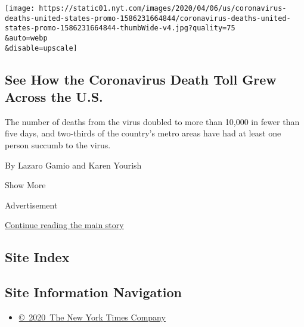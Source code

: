 \begin{enumerate}
  \texttt{[image: https://static01.nyt.com/images/2020/04/06/us/coronavirus-deaths-united-states-promo-1586231664844/coronavirus-deaths-united-states-promo-1586231664844-thumbWide-v4.jpg?quality=75\\\&auto=webp\\\&disable=upscale]}

  \hypertarget{see-how-the-coronavirus-death-toll-grew-across-the-us}{%
  \subsection{See How the Coronavirus Death Toll Grew Across the
  U.S.}\label{see-how-the-coronavirus-death-toll-grew-across-the-us}}

  The number of deaths from the virus doubled to more than 10,000 in
  fewer than five days, and two-thirds of the country's metro areas have
  had at least one person succumb to the virus.

  By Lazaro Gamio and Karen Yourish
\end{enumerate}

Show More

Advertisement

\protect\hyperlink{after-mid2}{Continue reading the main story}

\hypertarget{site-index}{%
\subsection{Site Index}\label{site-index}}

\hypertarget{site-information-navigation}{%
\subsection{Site Information
Navigation}\label{site-information-navigation}}

\begin{itemize}
\tightlist
\item
  \href{https://help.nytimes.com/hc/en-us/articles/115014792127-Copyright-notice}{©~2020~The
  New York Times Company}
\end{itemize}

